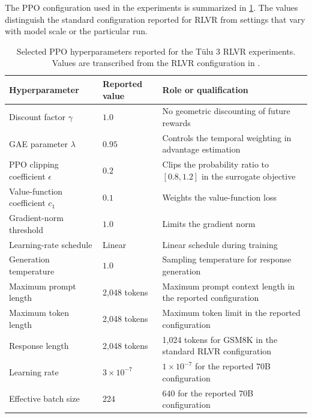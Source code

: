The PPO configuration used in the experiments is summarized in
\cref{tab:rlvr-ppo-hyperparameters}. The values distinguish the standard
configuration reported for RLVR from settings that vary with model scale or
the particular run.

\begin{table}[htbp]
    \centering
    \caption{Selected PPO hyperparameters reported for the Tülu 3 RLVR
    experiments. Values are transcribed from the RLVR configuration in
    \textcite{lambert2025tulu3}.}
    \label{tab:rlvr-ppo-hyperparameters}
    \small
    \begin{tabularx}{\textwidth}{l l X}
        \toprule
        \textbf{Hyperparameter}
        & \textbf{Reported value}
        & \textbf{Role or qualification}\\
        \midrule
        Discount factor \(\gamma\)
        & \(1.0\)
        & No geometric discounting of future rewards\\
        GAE parameter \(\lambda\)
        & \(0.95\)
        & Controls the temporal weighting in advantage estimation\\
        PPO clipping coefficient \(\epsilon\)
        & \(0.2\)
        & Clips the probability ratio to \([0.8,1.2]\) in the surrogate objective\\
        Value-function coefficient \(c_1\)
        & \(0.1\)
        & Weights the value-function loss\\
        Gradient-norm threshold
        & \(1.0\)
        & Limits the gradient norm\\
        Learning-rate schedule
        & Linear
        & Linear schedule during training\\
        Generation temperature
        & \(1.0\)
        & Sampling temperature for response generation\\
        Maximum prompt length
        & 2,048 tokens
        & Maximum prompt context length in the reported configuration\\
        Maximum token length
        & 2,048 tokens
        & Maximum token limit in the reported configuration\\
        Response length
        & 2,048 tokens
        & 1,024 tokens for GSM8K in the standard RLVR configuration\\
        Learning rate
        & \(3\times10^{-7}\)
        & \(1\times10^{-7}\) for the reported 70B configuration\\
        Effective batch size
        & 224
        & 640 for the reported 70B configuration\\

\end{tabularx}
\end{table}
